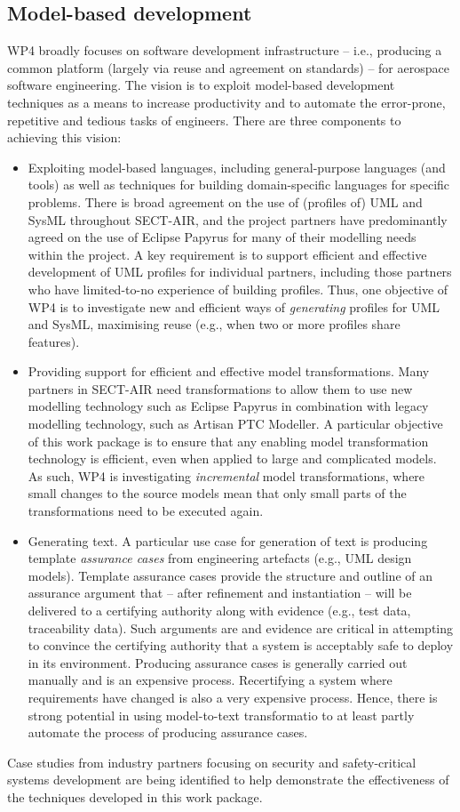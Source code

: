 \subsection{Model-based development}
WP4 broadly focuses on software development infrastructure -- i.e., producing a common platform (largely via reuse and agreement on standards) -- for aerospace
software engineering. The vision is to exploit model-based development techniques as a means to increase productivity and to automate the error-prone, repetitive
and tedious tasks of engineers. There are three components to achieving this vision:
\begin{itemize}
\item Exploiting model-based languages, including general-purpose languages (and tools) as well as techniques for building domain-specific languages for specific problems. 
There is broad agreement on the use of (profiles of) UML and SysML throughout SECT-AIR, and the project partners have predominantly agreed on the use of Eclipse
Papyrus for many of their modelling needs within the project. A key requirement is to support efficient and effective development of UML profiles for individual partners,
including those partners who have limited-to-no experience of building profiles. Thus, one objective of WP4 is to investigate new and efficient ways of \textit{generating}
profiles for UML and SysML, maximising reuse (e.g., when two or more profiles share features).

\item Providing support for efficient and effective model transformations. Many partners in SECT-AIR need transformations to allow them to use new modelling
technology such as Eclipse Papyrus in combination with legacy modelling technology, such as Artisan PTC Modeller. A particular objective of this work package is to
ensure that any enabling model transformation technology is efficient, even when applied to large and complicated models. As such, WP4 is investigating 
\textit{incremental} model transformations, where small changes to the source models mean that only small parts of the transformations need to be executed
again.


\item Generating text. A particular use case for generation of text is producing
template \textit{assurance cases} from engineering artefacts (e.g., UML design models). Template assurance cases provide the structure and outline of an assurance
argument that -- after refinement and instantiation -- will be delivered to a certifying authority along with evidence (e.g., test data, traceability data). Such arguments are
and evidence are critical in attempting to convince the certifying authority that a system is acceptably safe to deploy in its environment. Producing assurance cases is
generally carried out manually and is an expensive process. Recertifying a system where requirements have changed is also a very expensive process. Hence, there is strong
potential in using model-to-text transformatio to at least partly automate the process of producing assurance cases.
\end{itemize}

Case studies from industry partners focusing on security and safety-critical systems development are being identified to help demonstrate the effectiveness
of the techniques developed in this work package.



